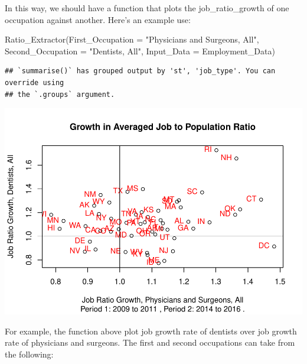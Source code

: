 \documentclass[
]{article}
\newenvironment{Shaded}{\begin{snugshade}}{\end{snugshade}}
\newcommand{\AttributeTok}[1]{\textcolor[rgb]{0.77,0.63,0.00}{#1}}
\newcommand{\FunctionTok}[1]{\textcolor[rgb]{0.00,0.00,0.00}{#1}}
\newcommand{\NormalTok}[1]{#1}
\newcommand{\SpecialCharTok}[1]{\textcolor[rgb]{0.00,0.00,0.00}{#1}}
\newcommand{\StringTok}[1]{\textcolor[rgb]{0.31,0.60,0.02}{#1}}
\begin{document}
In this way, we should have a function that plots the job\_ratio\_growth
of one occupation against another. Here's an example use:

\begin{Shaded}
\begin{Highlighting}[]
\FunctionTok{Ratio\_Extractor}\NormalTok{(}\AttributeTok{First\_Occupation =} \StringTok{"Physicians and Surgeons, All"}\NormalTok{, }
                \AttributeTok{Second\_Occupation =} \StringTok{"Dentists, All"}\NormalTok{, }
                \AttributeTok{Input\_Data =}\NormalTok{ Employment\_Data)}
\end{Highlighting}
\end{Shaded}

\begin{verbatim}
## `summarise()` has grouped output by 'st', 'job_type'. You can override using
## the `.groups` argument.
\end{verbatim}

\includegraphics{BLS_Graphic_Reproduction_files/figure-latex/unnamed-chunk-4-1.pdf}

For example, the function above plot job growth rate of dentists over
job growth rate of physicians and surgeons. The first and second
occupations can take from the following:

\begin{Shaded}
\end{Shaded}
\end{document}
